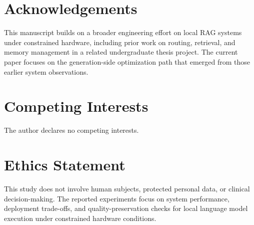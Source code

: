\documentclass[10pt,twocolumn]{article}
\newif\ifanonymized
\begin{document}
\section*{Acknowledgements}

\ifanonymized
Acknowledgements are omitted during anonymous review and will be restored in the camera-ready or non-anonymous submission version.
\else
This manuscript builds on a broader engineering effort on local RAG systems under constrained hardware, including prior work on routing, retrieval, and memory management in a related undergraduate thesis project. The current paper focuses on the generation-side optimization path that emerged from those earlier system observations.
\fi

\section*{Competing Interests}

The author declares no competing interests.

\section*{Ethics Statement}

This study does not involve human subjects, protected personal data, or clinical decision-making. The reported experiments focus on system performance, deployment trade-offs, and quality-preservation checks for local language model execution under constrained hardware conditions.



\end{document}

